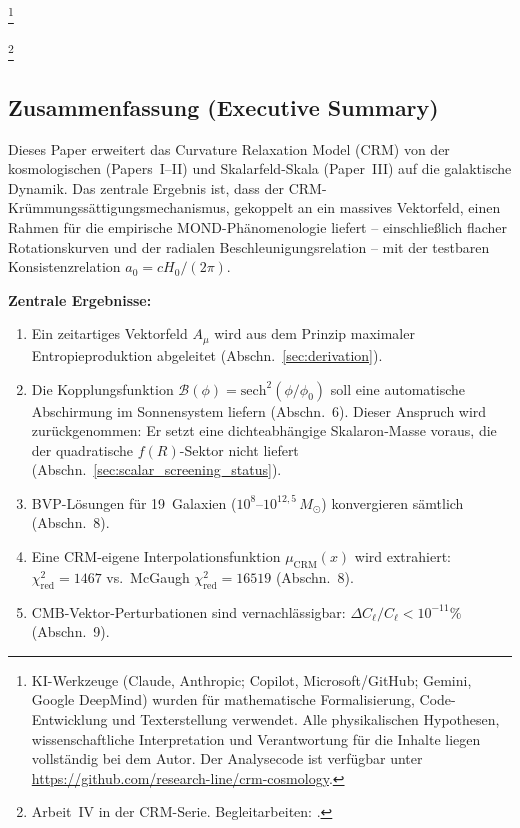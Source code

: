 \documentclass[aps,prd,twocolumn,superscriptaddress,nofootinbib]{revtex4-2}
\begin{document}

\thanks{KI-Werkzeuge (Claude, Anthropic; Copilot, Microsoft/GitHub; Gemini, Google DeepMind) wurden für mathematische Formalisierung, Code-Entwicklung und Texterstellung verwendet. Alle physikalischen Hypothesen, wissenschaftliche Interpretation und Verantwortung für die Inhalte liegen vollständig bei dem Autor. Der Analysecode ist verfügbar unter \url{https://github.com/research-line/crm-cosmology}.}

\thanks{Arbeit~IV in der CRM-Serie. Begleitarbeiten: \cite{Geiger2026,Geiger2026b,Geiger2026c}.}

\maketitle

\subsection*{Zusammenfassung (Executive Summary)}

Dieses Paper erweitert das Curvature Relaxation Model (CRM) von der kosmologischen (Papers~I--II) und Skalarfeld-Skala (Paper~III) auf die galaktische Dynamik. Das zentrale Ergebnis ist, dass der CRM-Kr\"ummungss\"attigungsmechanismus, gekoppelt an ein massives Vektorfeld, einen Rahmen f\"ur die empirische MOND-Ph\"anomenologie liefert -- einschlie\ss{}lich flacher Rotationskurven und der radialen Beschleunigungsrelation -- mit der testbaren Konsistenzrelation $a_0 = cH_0/(2\pi)$.

\textbf{Zentrale Ergebnisse:}
\begin{enumerate}
\item Ein zeitartiges Vektorfeld $A_\mu$ wird aus dem Prinzip maximaler Entropieproduktion abgeleitet (Abschn.~\ref{sec:derivation}).
\item Die Kopplungsfunktion $\mathcal{B}(\phi) = \mathrm{sech}^2(\phi/\phi_0)$ soll eine automatische Abschirmung im Sonnensystem liefern (Abschn.~6). Dieser Anspruch wird zur\"uckgenommen: Er setzt eine dichteabh\"angige Skalaron-Masse voraus, die der quadratische $f(R)$-Sektor nicht liefert (Abschn.~\ref{sec:scalar_screening_status}).
\item BVP-L\"osungen f\"ur 19~Galaxien ($10^8$--$10^{12{,}5}\,M_\odot$) konvergieren s\"amtlich (Abschn.~8).
\item Eine CRM-eigene Interpolationsfunktion $\mu_{\mathrm{CRM}}(x)$ wird extrahiert: $\chi^2_{\mathrm{red}} = 1467$ vs.\ McGaugh $\chi^2_{\mathrm{red}} = 16519$ (Abschn.~8).
\item CMB-Vektor-Perturbationen sind vernachl\"assigbar: $\Delta C_\ell/C_\ell < 10^{-11}\%$ (Abschn.~9).
\end{enumerate}
\end{document}
